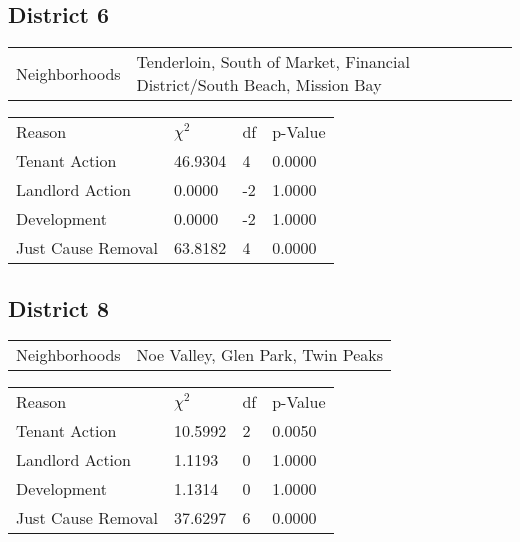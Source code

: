 \documentclass[]{article}
\begin{document}
\subsection{District 6}


\begin{table}[h]
	\centering
	\begin{tabular}{l | l}
		Neighborhoods & Tenderloin, South of Market, Financial District/South Beach, Mission Bay  \\
	\end{tabular}
\end{table}
\FloatBarrier

\begin {table}[h]
\centering
\begin{tabular}{l | l | l | l}
	
	Reason				 &  $\chi ^{2}$ & df & p-Value \\
	Tenant Action 		   &  46.9304  & 4  & 0.0000 \\
	Landlord Action	       &  0.0000  & -2  & 1.0000 \\
	Development			   &  0.0000  & -2  & 1.0000 \\
	Just Cause Removal	   &  63.8182  & 4  & 0.0000 \\
\end{tabular} \newline
\end{table}
\FloatBarrier

\subsection{District 8}

\begin{table}[h]
	\centering
	\begin{tabular}{l | l}
		Neighborhoods & Noe Valley, Glen Park, Twin Peaks
	\end{tabular}
\end{table}
\FloatBarrier

\begin {table}[h]
\centering
\begin{tabular}{l | l | l | l}
	
	Reason				 &  $\chi ^{2}$ & df & p-Value \\
	Tenant Action 		   &  10.5992  &  2 & 0.0050 \\
	Landlord Action	       &  1.1193  &  0 & 1.0000 \\
	Development			   &  1.1314  & 0  & 1.0000 \\
	Just Cause Removal	   &  37.6297  &  6 & 0.0000 \\
\end{tabular} \newline
\end{table}
\FloatBarrier
\end{document}
